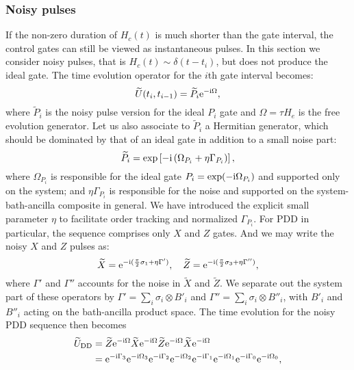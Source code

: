 \documentclass[pra,reprint,superscriptaddress]{revtex4-2}
\newcommand{\wtP}{\widetilde{P}}
\newcommand{\wtU}{\widetilde{U}}
\newcommand{\wt}[1]{\widetilde{#1}}
\newcommand{\rDD}{\mathrm{DD}}
\begin{document}
\subsubsection{Noisy pulses}
If the non-zero duration of $H_c(t)$ is much shorter than the gate interval,  the control gates can still be viewed as instantaneous pulses. In this section we consider noisy pulses, that is 
$H_c(t)\sim \delta(t-t_i)$, but does not produce the ideal gate.
The  time evolution operator for the $i$th gate interval becomes:
\begin{equation}\label{eq:npulses-Ui}
 \wtU(t_i,t_{i-1}) = \wtP_i \upe^{-\upi \Omega},
\end{equation}
where $\widetilde{P}_i$ is the noisy pulse version for the ideal $P_i$ gate and $\Omega=\tau H_e$ is the free evolution generator.
Let us also associate to $\wtP_i$ a Hermitian generator, which should be dominated by that of an ideal gate in addition to a small noise part:
\begin{equation}\label{eq:npulses-Pi}
 \widetilde{P}_i= \exp\left[ -\mathrm{i} \left( \Omega_{P_i} +  \eta \Gamma_{P_i} \right)  \right],
\end{equation}
where $\Omega_{P_i}$ is responsible for the ideal gate $P_i = \exp(-\mathrm{i} \Omega_{P_i})$ and supported only on the system; and $ \eta \Gamma_{P_i} $ is responsible for the noise and supported on the system-bath-ancilla composite in general. We have introduced the explicit small parameter $\eta$ to facilitate order tracking and normalized $\Gamma_{P_i}$. For PDD in particular, the sequence comprises only $X$ and $Z$ gates. 
And we may write the noisy $X$ and $Z$ pulses as:
\begin{equation}
\widetilde{X} = \mathrm{e}^{-\mathrm{i} ( \frac{\pi}{2} \sigma_1 + \eta\Gamma')},\quad
 \widetilde{Z} = \mathrm{e}^{-\mathrm{i} ( \frac{\pi}{2} \sigma_3 + \eta\Gamma'')},
\end{equation}
where $\Gamma'$ and $\Gamma''$ accounts for the noise in $\wt X$ and $\wt Z$.
We separate out the system part of these operators by $\Gamma' = \sum_i \sigma_i \otimes B'_i $ and $\Gamma''=\sum_i \sigma_i \otimes B''_i$, with $B'_i$ and $B''_i$ acting on the bath-ancilla product space. 
The time evolution for the noisy PDD sequence then becomes
\begin{equation}\label{eq:UPDD-gatedep}
 \begin{aligned}
\wtU_\rDD &=
 \widetilde{Z} \upe^{-\upi \Omega}
 \widetilde{X} \upe^{-\upi \Omega}
 \widetilde{Z} \upe^{-\upi \Omega}
 \widetilde{X} \upe^{-\upi \Omega}\\
 & = \upe^{-\upi  \Gamma_3} \upe^{- \upi\Omega_3}
 \upe^{-\upi  \Gamma_2}  \upe^{-\upi\Omega_2}
\upe^{-\upi  \Gamma_1} \upe^{-\upi\Omega_1}
\upe^{-\upi  \Gamma_0}  \upe^{-\upi \Omega_0},
\end{aligned}
\end{equation}
\end{document}
